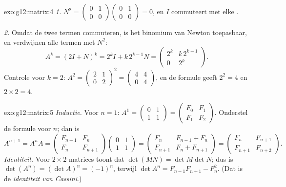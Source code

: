 \begin{solution}{exo:g12:matrix:4}
\emph{1.} $N^2 = \begin{pmatrix} 0&1\\0&0\end{pmatrix}
\begin{pmatrix} 0&1\\0&0\end{pmatrix} = 0$, en $I$ commuteert met elke .

\emph{2.} Omdat de twee termen commuteren, is het binomium van Newton
toepasbaar, en verdwijnen alle termen met $N^2$:
\[
A^k = (2I + N)^k = 2^k I + k\,2^{k-1} N
= \begin{pmatrix} 2^k & k\,2^{k-1}\\ 0 & 2^k \end{pmatrix}.
\]
Controle voor $k = 2$:
$A^2 = \begin{pmatrix} 2&1\\0&2\end{pmatrix}^2
= \begin{pmatrix} 4&4\\0&4\end{pmatrix}$, en de formule geeft
$2^2 = 4$ en $2 \times 2 = 4$. \checkmark
\end{solution}

\begin{solution}{exo:g12:matrix:5}
\emph{Inductie.} Voor $n = 1$:
$A^1 = \begin{pmatrix} 0&1\\1&1\end{pmatrix}
= \begin{pmatrix} F_0 & F_1\\ F_1 & F_2\end{pmatrix}$. Onderstel de formule
voor $n$; dan is
\[
A^{n+1} = A^n A
= \begin{pmatrix} F_{n-1} & F_n\\ F_n & F_{n+1}\end{pmatrix}
\begin{pmatrix} 0 & 1\\ 1 & 1\end{pmatrix}
= \begin{pmatrix} F_n & F_{n-1} + F_n\\ F_{n+1} & F_n + F_{n+1}\end{pmatrix}
= \begin{pmatrix} F_n & F_{n+1}\\ F_{n+1} & F_{n+2}\end{pmatrix}.
\]
\emph{Identiteit.} Voor $2\times2$-matrices toont  dat
$\det(MN) = \det M \det N$; dus is $\det(A^n) = (\det A)^n = (-1)^n$, terwijl
$\det A^n = F_{n-1}F_{n+1} - F_n^2$. (Dat is de \emph{identiteit van
Cassini}.)
\end{solution}

